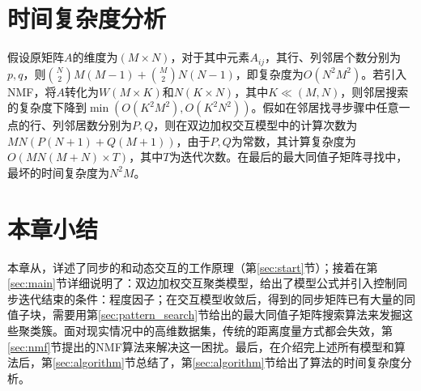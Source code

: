 \section{时间复杂度分析}
\label{time_complex}
\vspace{-2mm}
假设原矩阵$A$的维度为$(M\times{}N)$，对于其中元素$A_{ij}$，其行、列邻居个数分别为$p,q$，则${N\choose2}M(M-1)+{M\choose2}N(N-1)$，即复杂度为$O(N^2 M^2)$。若引入NMF，将$A$转化为$W(M\times{}K)$和$N(K\times{}N)$，其中$K\ll{}(M,N)$，则邻居搜索的复杂度下降到$\min\left(O\left(K^2M^2\right),O\left(K^2N^2\right)\right)$。假如在邻居找寻步骤中任意一点的行、列邻居数分别为$P,Q$，则在双边加权交互模型中的计算次数为$MN(P(N+1)+Q(M+1))$，由于$P,Q$为常数，其计算复杂度为$O(MN(M+N)\times{}T)$，其中$T$为迭代次数。在最后的最大同值子矩阵寻找中，最坏的时间复杂度为$N^2M$。

\vspace{-2mm}
\section{本章小结}
\vspace{-2mm}
本章从，详述了同步的和动态交互的工作原理（第\ref{sec:start}节）；接着在第\ref{sec:main}节详细说明了：双边加权交互聚类模型，给出了模型公式并引入控制同步迭代结束的条件：程度因子；在交互模型收敛后，得到的同步矩阵已有大量的同值子块，需要用第\ref{sec:pattern_search}节给出的最大同值子矩阵搜索算法来发掘这些聚类簇。面对现实情况中的高维数据集，传统的距离度量方式都会失效，第\ref{sec:nmf}节提出的NMF算法来解决这一困扰。最后，在介绍完上述所有模型和算法后，第\ref{sec:algorithm}节总结了，第\ref{sec:algorithm}节给出了算法的时间复杂度分析。

